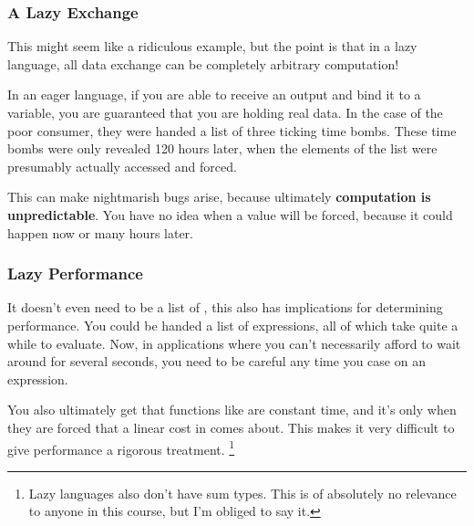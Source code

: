 \documentclass[aspectratio=169, handout]{beamer}
\begin{document}
\begin{frame}[fragile]
  \frametitle{A Lazy Exchange}

  This might seem like a ridiculous example, but the point is that in a
  lazy language, all data exchange can be completely arbitrary computation!

  \pause
  \vspace{\fill}

  In an eager language, if you are able to receive an output and bind it
  to a variable, you are guaranteed that you are holding real data. In the
  case of the poor consumer, they were handed a list of three ticking time
  bombs. These time bombs were only revealed 120 hours later, when the elements
  of the list were presumably actually accessed and forced.

  \pause
  \vspace{\fill}

  This can make nightmarish bugs arise, because ultimately
  \textbf{computation is unpredictable}. You have no idea when a value will be
  forced, because it could happen now or many hours later.
\end{frame}

\begin{frame}[fragile]
  \frametitle{Lazy Performance}

  It doesn't even need to be a list of , this also has
  implications for determining performance. You could be handed a list
  of expressions, all of which take quite a while to evaluate. Now, in
  applications where you can't necessarily afford to wait around for
  several seconds, you need to be careful any time you case on an expression.

  \pause
  \vspace{\fill}

  You also ultimately get that functions like  are constant time,
  and it's only when they are forced that a linear cost in  comes
  about. This makes it very difficult to give performance a rigorous treatment.
  \footnote{Lazy languages also don't have sum types. This is of absolutely no
  relevance to anyone in this course, but I'm obliged to say it.}
\end{frame}
\end{document}
